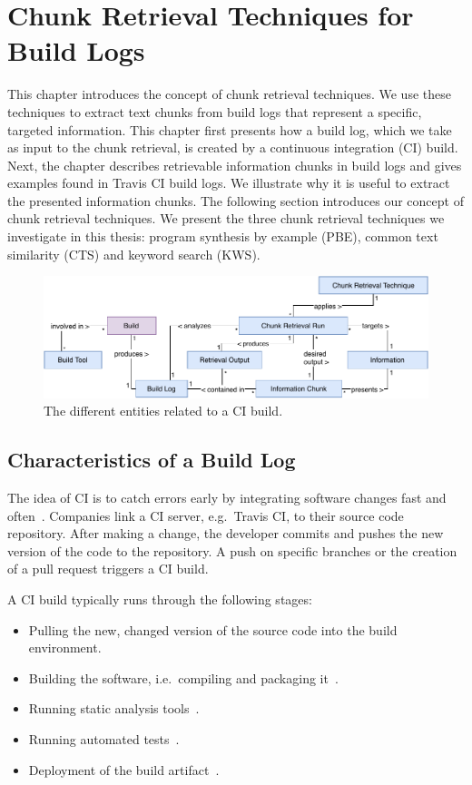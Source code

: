 \documentclass[\myrootdir/main.tex]{subfiles}
\begin{document}
\chapter{Chunk Retrieval Techniques for Build Logs}
\label{sec:techniques}
This chapter introduces the concept of chunk retrieval techniques.
We use these techniques to extract text chunks from build logs that represent a specific, targeted information.
This chapter first presents how a build log, which we take as input to the chunk retrieval, is created by a continuous integration (CI) build.
Next, the chapter describes retrievable information chunks in build logs and gives examples found in Travis CI build logs.
We illustrate why it is useful to extract the presented information chunks.
The following section introduces our concept of chunk retrieval techniques.
We present the three chunk retrieval techniques we investigate in this thesis:
program synthesis by example (PBE), common text similarity (CTS) and keyword search (KWS).

\begin{figure}[htbp]
	\centering
	\includegraphics[width=\textwidth, clip]{img/build-overview.pdf}
	\caption{The different entities related to a CI build.}
	\label{fig:build-overview}
\end{figure}

\section{Characteristics of a Build Log}
\label{sec:bl-characteristics}
The idea of CI is to catch errors early by integrating software changes fast and often~\cite{humble2010continuous}.
Companies link a CI server, e.g.\ Travis CI, to their source code repository.
After making a change, the developer commits and pushes the new version of the code to the repository.
A push on specific branches or the creation of a pull request triggers a CI build.

A CI build typically runs through the following stages:
\begin{itemize}
	\item Pulling the new, changed version of the source code into the build environment.
	\item Building the software, i.e.\ compiling and packaging it~\cite{phillips2014understanding}.
	\item Running static analysis tools~\cite{zampetti2017open}.
	\item Running automated tests~\cite{beller2017oops}.
	\item Deployment of the build artifact~\cite{schermann2016empirical}.
\end{itemize}
\end{document}
